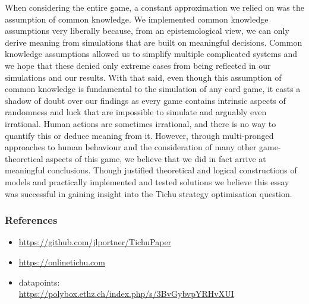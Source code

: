 When considering the entire game, a constant approximation we relied on was the assumption of common knowledge. We implemented common knowledge assumptions very liberally because, from an epistemological view, we can only derive meaning from simulations that are built on meaningful decisions. Common knowledge assumptions allowed us to simplify multiple complicated systems and we hope that these denied only extreme cases from being reflected in our simulations and our results. With that said, even though this assumption of common knowledge is fundamental to the simulation of any card game, it casts a shadow of doubt over our findings as every game contains intrinsic aspects of randomness and luck that are impossible to simulate and arguably even irrational. Human actions are sometimes irrational, and there is no way to quantify this or deduce meaning from it. However, through multi-pronged approaches to human behaviour and the consideration of many other game-theoretical aspects of this game, we believe that we did in fact arrive at meaningful conclusions. Though justified theoretical and logical constructions of models and practically implemented and tested solutions we believe this essay was successful in gaining insight into the Tichu strategy optimisation question.
\subsubsection{References}
\begin{itemize}
\item \url{https://github.com/jlportner/TichuPaper} \label{github}
\item \url{https://onlinetichu.com}
\item datapoints: \\
\url{https://polybox.ethz.ch/index.php/s/3BvGybvpYRHvXUI}
\end{itemize}



